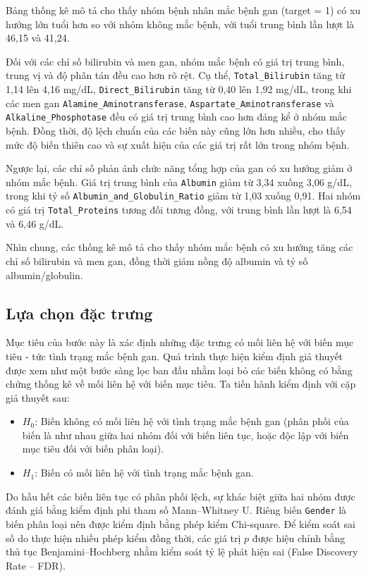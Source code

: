 \documentclass[14pt,a4paper]{extarticle}\usepackage[]{graphicx}\usepackage[]{xcolor}
\begin{document}
Bảng thống kê mô tả cho thấy nhóm bệnh nhân mắc bệnh gan (target = 1) có xu
hướng lớn tuổi hơn so với nhóm không mắc bệnh, với tuổi trung bình lần lượt
là 46,15 và 41,24.

Đối với các chỉ số bilirubin và men gan, nhóm mắc bệnh có giá trị trung bình,
trung vị và độ phân tán đều cao hơn rõ rệt. Cụ thể,
\texttt{Total\_Bilirubin} tăng từ 1,14 lên 4,16 mg/dL,
\texttt{Direct\_Bilirubin} tăng từ 0,40 lên 1,92 mg/dL, trong khi các men gan
\texttt{Alamine\_Aminotransferase},
\texttt{Aspartate\_Aminotransferase} và
\texttt{Alkaline\_Phosphotase} đều có giá trị trung bình cao hơn đáng kể ở
nhóm mắc bệnh. Đồng thời, độ lệch chuẩn của các biến này cũng lớn hơn nhiều,
cho thấy mức độ biến thiên cao và sự xuất hiện của các giá trị rất lớn trong
nhóm bệnh.

Ngược lại, các chỉ số phản ánh chức năng tổng hợp của gan có xu hướng giảm ở
nhóm mắc bệnh. Giá trị trung bình của \texttt{Albumin} giảm từ 3,34 xuống
3,06 g/dL, trong khi tỷ số
\texttt{Albumin\_and\_Globulin\_Ratio} giảm từ 1,03 xuống 0,91. Hai nhóm có
giá trị \texttt{Total\_Proteins} tương đối tương đồng, với trung bình lần
lượt là 6,54 và 6,46 g/dL.

Nhìn chung, các thống kê mô tả cho thấy nhóm mắc bệnh có xu hướng tăng các
chỉ số bilirubin và men gan, đồng thời giảm nồng độ albumin và tỷ số
albumin/globulin.

\subsection{Lựa chọn đặc trưng}

Mục tiêu của bước này là xác định những đặc trưng có mối liên hệ với biến mục tiêu - tức tình trạng
mắc bệnh gan. Quá trình thực hiện kiểm định giả thuyết được xem như một bước sàng lọc ban đầu
nhằm loại bỏ các biến không có bằng chứng thống kê về mối liên hệ với biến mục tiêu.
Ta tiến hành kiểm định với cặp giả thuyết sau:

\begin{itemize}
    \item $H_0$: Biến không có mối liên hệ với tình trạng mắc bệnh gan (phân
    phối của biến là như nhau giữa hai nhóm đối với biến liên tục, hoặc độc
    lập với biến mục tiêu đối với biến phân loại).
    \item $H_1$: Biến có mối liên hệ với tình trạng mắc bệnh gan.
\end{itemize}

Do hầu hết các biến liên tục có phân phối lệch, sự khác biệt giữa hai nhóm
được đánh giá bằng kiểm định phi tham số Mann--Whitney U. Riêng biến
\texttt{Gender} là biến phân loại nên được kiểm định bằng phép kiểm
Chi-square. Để kiểm soát sai số do thực hiện nhiều phép kiểm đồng thời, các
giá trị $p$ được hiệu chỉnh bằng thủ tục Benjamini--Hochberg nhằm kiểm soát
tỷ lệ phát hiện sai (False Discovery Rate -- FDR).
\end{document}
